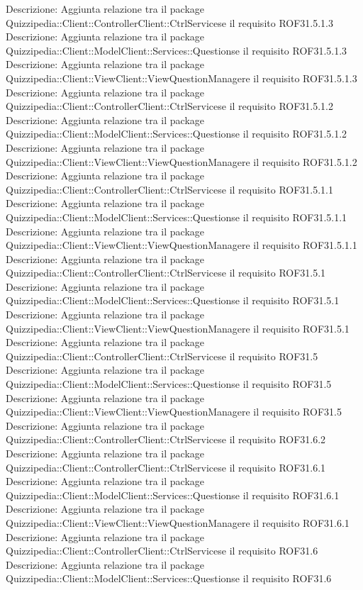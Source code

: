 Descrizione: Aggiunta relazione tra il package Quizzipedia::Client::ControllerClient::CtrlServicese il requisito ROF31.5.1.3 
Descrizione: Aggiunta relazione tra il package Quizzipedia::Client::ModelClient::Services::Questionse il requisito ROF31.5.1.3 
Descrizione: Aggiunta relazione tra il package Quizzipedia::Client::ViewClient::ViewQuestionManagere il requisito ROF31.5.1.3 
Descrizione: Aggiunta relazione tra il package Quizzipedia::Client::ControllerClient::CtrlServicese il requisito ROF31.5.1.2 
Descrizione: Aggiunta relazione tra il package Quizzipedia::Client::ModelClient::Services::Questionse il requisito ROF31.5.1.2 
Descrizione: Aggiunta relazione tra il package Quizzipedia::Client::ViewClient::ViewQuestionManagere il requisito ROF31.5.1.2 
Descrizione: Aggiunta relazione tra il package Quizzipedia::Client::ControllerClient::CtrlServicese il requisito ROF31.5.1.1 
Descrizione: Aggiunta relazione tra il package Quizzipedia::Client::ModelClient::Services::Questionse il requisito ROF31.5.1.1 
Descrizione: Aggiunta relazione tra il package Quizzipedia::Client::ViewClient::ViewQuestionManagere il requisito ROF31.5.1.1 
Descrizione: Aggiunta relazione tra il package Quizzipedia::Client::ControllerClient::CtrlServicese il requisito ROF31.5.1 
Descrizione: Aggiunta relazione tra il package Quizzipedia::Client::ModelClient::Services::Questionse il requisito ROF31.5.1 
Descrizione: Aggiunta relazione tra il package Quizzipedia::Client::ViewClient::ViewQuestionManagere il requisito ROF31.5.1 
Descrizione: Aggiunta relazione tra il package Quizzipedia::Client::ControllerClient::CtrlServicese il requisito ROF31.5 
Descrizione: Aggiunta relazione tra il package Quizzipedia::Client::ModelClient::Services::Questionse il requisito ROF31.5 
Descrizione: Aggiunta relazione tra il package Quizzipedia::Client::ViewClient::ViewQuestionManagere il requisito ROF31.5 
Descrizione: Aggiunta relazione tra il package Quizzipedia::Client::ControllerClient::CtrlServicese il requisito ROF31.6.2 
Descrizione: Aggiunta relazione tra il package Quizzipedia::Client::ControllerClient::CtrlServicese il requisito ROF31.6.1 
Descrizione: Aggiunta relazione tra il package Quizzipedia::Client::ModelClient::Services::Questionse il requisito ROF31.6.1 
Descrizione: Aggiunta relazione tra il package Quizzipedia::Client::ViewClient::ViewQuestionManagere il requisito ROF31.6.1 
Descrizione: Aggiunta relazione tra il package Quizzipedia::Client::ControllerClient::CtrlServicese il requisito ROF31.6 
Descrizione: Aggiunta relazione tra il package Quizzipedia::Client::ModelClient::Services::Questionse il requisito ROF31.6 
